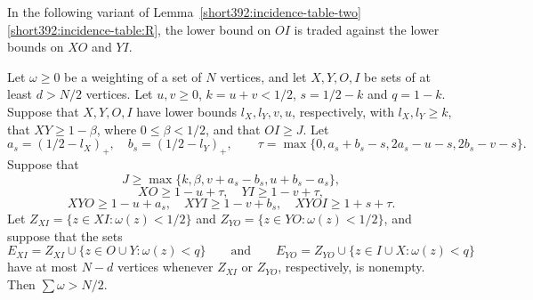In the following variant of Lemma~\ref{short392:incidence-table-two}\ref{short392:incidence-table:R}, the lower bound on $OI$ is traded against the lower bounds on $XO$ and $YI$.

\begin{lemma}
\label{surplus380:coupled}
Let $\omega\ge0$ be a weighting of a set of $N$ vertices, and let $X,Y,O,I$ be sets of at least $d>N/2$ vertices. Let $u,v\ge0$, $k=u+v<1/2$,
$s=1/2-k$ and $q=1-k$. Suppose that $X,Y,O,I$ have lower bounds
$l_X,l_Y,v,u$, respectively, with $l_X,l_Y\ge k$,
that $XY\ge1-\beta$, where $0\le\beta<1/2$,
and that $OI\ge J$. Let
\[
 a_s=(1/2-l_X)_+,\quad b_s=(1/2-l_Y)_+,\qquad
 \tau=\max\{0,a_s+b_s-s,2a_s-u-s,2b_s-v-s\}.
\]
Suppose that
\[
 J\ge\max\{k,\beta,v+a_s-b_s,u+b_s-a_s\},
\]
\[
 XO\ge1-u+\tau,\quad YI\ge1-v+\tau,
\]
\[
 XYO\ge1-u+a_s,\quad XYI\ge1-v+b_s,\quad
                                      XYOI\ge1+s+\tau.
\]
Let $Z_{XI}=\{z\in XI:\omega(z)<1/2\}$ and
$Z_{YO}=\{z\in YO:\omega(z)<1/2\}$, and suppose that the sets
\[
 E_{XI}=Z_{XI}\cup\{z\in O\cup Y:\omega(z)<q\}\qquad\text{and}\qquad
 E_{YO}=Z_{YO}\cup\{z\in I\cup X:\omega(z)<q\}
\]
have at most $N-d$ vertices whenever $Z_{XI}$ or $Z_{YO}$, respectively,
is nonempty.
Then $\sum\omega>N/2$.
\end{lemma}
